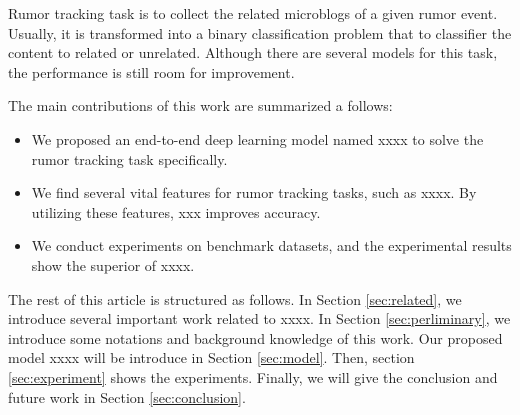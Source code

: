 Rumor tracking task is to collect the related microblogs of a given rumor event. Usually, it is transformed into a binary classification problem that to classifier the content to related or unrelated. Although there are several models for this task, the performance is still room for improvement.

The main contributions of this work are summarized a follows:
\begin{itemize}
	\item We proposed an end-to-end deep learning model named xxxx to solve the rumor tracking task specifically.
	\item We find several vital features for rumor tracking tasks, such as xxxx. By utilizing these features, xxx improves accuracy.
	\item We conduct experiments on benchmark datasets, and the experimental results show the superior of xxxx.
\end{itemize}

The rest of this article is structured as follows. In Section \ref{sec:related}, we introduce several important work related to xxxx. In Section \ref{sec:perliminary}, we introduce some notations and background knowledge of this work. Our proposed model xxxx will be introduce in Section \ref{sec:model}. Then, section \ref{sec:experiment} shows the experiments. Finally, we will give the conclusion and future work in Section \ref{sec:conclusion}.